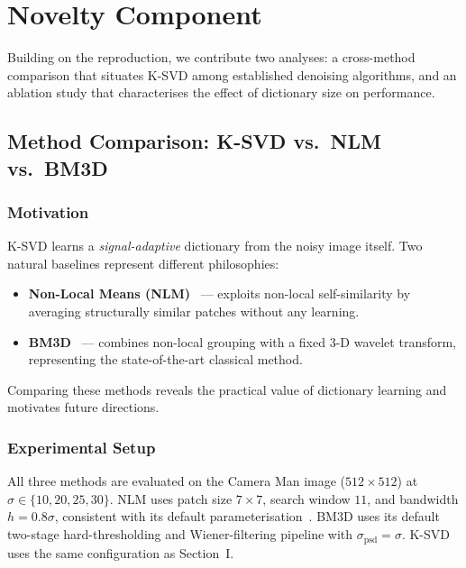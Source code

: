 
\section{Novelty Component}

Building on the reproduction, we contribute two analyses: a
cross-method comparison that situates K-SVD among established
denoising algorithms, and an ablation study that characterises
the effect of dictionary size on performance.

\subsection{Method Comparison: K-SVD vs.\ NLM vs.\ BM3D}

\subsubsection{Motivation}

K-SVD learns a \emph{signal-adaptive} dictionary from the noisy
image itself.  Two natural baselines represent different
philosophies:
\begin{itemize}
    \item \textbf{Non-Local Means (NLM)}~\cite{buades2005nlm} —
          exploits non-local self-similarity by averaging
          structurally similar patches without any learning.
    \item \textbf{BM3D}~\cite{dabov2007bm3d} — combines
          non-local grouping with a fixed 3-D wavelet transform,
          representing the state-of-the-art classical method.
\end{itemize}
Comparing these methods reveals the practical value of dictionary
learning and motivates future directions.

\subsubsection{Experimental Setup}

All three methods are evaluated on the Camera Man image
($512\times512$) at $\sigma\in\{10,20,25,30\}$.
NLM uses patch size $7\times7$, search window $11$, and
bandwidth $h=0.8\sigma$, consistent with its default
parameterisation~\cite{buades2005nlm}.
BM3D uses its default two-stage hard-thresholding and
Wiener-filtering pipeline with $\sigma_{\text{psd}}=\sigma$.
K-SVD uses the same configuration as Section~I.

